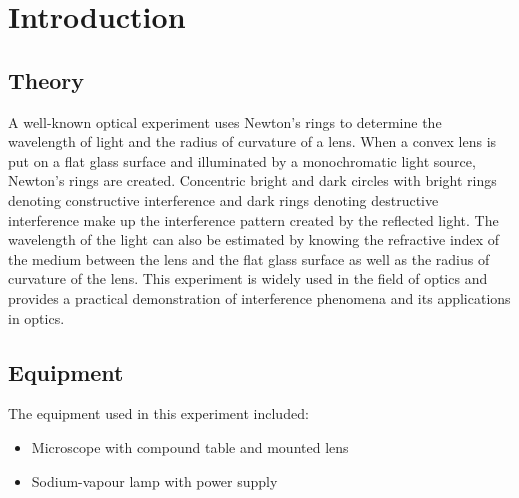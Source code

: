 \section{Introduction}

\subsection{Theory}
A well-known optical experiment uses Newton's rings to determine the wavelength of light and the radius of curvature of a lens. When a convex lens is put on a flat glass surface and illuminated by a monochromatic light source, Newton's rings are created. Concentric bright and dark circles with bright rings denoting constructive interference and dark rings denoting destructive interference make up the interference pattern created by the reflected light. The wavelength of the light can also be estimated by knowing the refractive index of the medium between the lens and the flat glass surface as well as the radius of curvature of the lens. This experiment is widely used in the field of optics and provides a practical demonstration of interference phenomena and its applications in optics.


\subsection{Equipment}
The equipment used in this experiment included:
\begin{itemize}
	\item Microscope with compound table and mounted lens
	\item Sodium-vapour lamp with power supply

\end{itemize}


